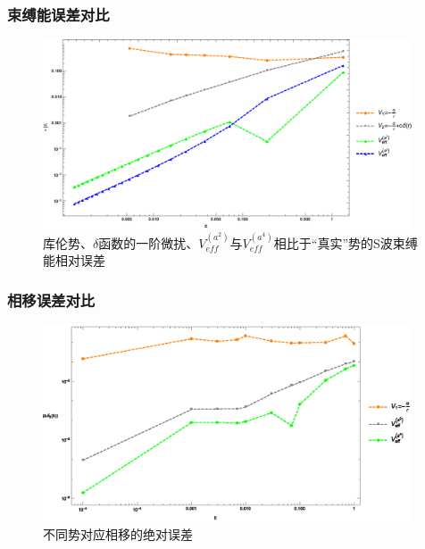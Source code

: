 \documentclass[8pt]{beamer}
\begin{document}
\begin{frame}
\frametitle{束缚能误差对比}
\begin{figure}[!htbp]
	\centering
	\includegraphics[width=4.3in]{Test_PS_CurveFitting_Figure2.eps}
	\caption{库伦势、$\delta$函数的一阶微扰、$V_{eff}^{(a^2)}$与$V_{eff}^{(a^4)}$相比于“真实”势的S波束缚能相对误差}\label{Swaveenergyerror}
\end{figure}
\end{frame}

\begin{frame}
\frametitle{相移误差对比}
\begin{figure}[!htbp]
	\centering
	\includegraphics[width=4.3in]{Test_PS_CurveFitting_Figure3.eps}
	\caption{不同势对应相移的绝对误差}\label{Swavephaseerror}
\end{figure}
\end{frame}
\end{document}
